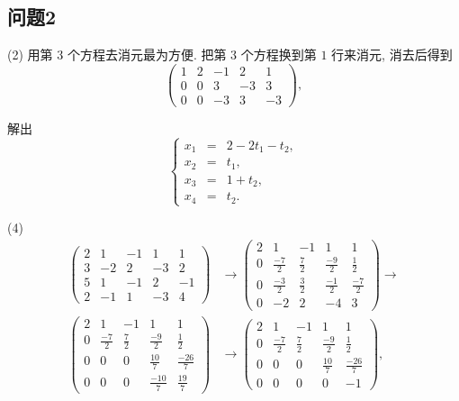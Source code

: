 \newpage
\subsection*{问题2}

(2) 用第 $3$ 个方程去消元最为方便. 把第 $3$ 个方程换到第 $1$ 行来消元, 消去后得到
\[
\left(
\begin{array}{cccc|c}
    1 & 2 & -1 & 2 & 1 \\
    0 & 0 & 3 & -3 & 3 \\
    0 & 0 & -3 & 3 & -3 
\end{array}
\right),
\]

解出
\[
    \left\{
    \begin{aligned}
    x_1 &{}={} & 2 - 2t_1 - t_2, \\
    x_2 &{}={} & t_1, \\
    x_3 &{}={} & 1 + t_2, \\
    x_4 &{}={} & t_2.
    \end{aligned}
    \right.
\]

(4) 
\[
\begin{aligned}
\left(
\begin{array}{cccc|c}
    2 & 1 & -1 & 1 & 1 \\
    3 & -2 & 2 & -3 & 2 \\
    5 & 1 & -1 & 2 & -1 \\
    2 & -1 & 1 & -3 & 4
\end{array}
\right)
& \to 
\left(
\begin{array}{cccc|c}
    2 & 1 & -1 & 1 & 1 \\
    0 & \frac{-7}{2} & \frac{7}{2} & \frac{-9}{2} & \frac{1}{2} \\
    0 & \frac{-3}{2} & \frac{3}{2} & \frac{-1}{2} & \frac{-7}{2} \\
    0 & -2 & 2 & -4 & 3
\end{array}
\right) \to \\
\left(
\begin{array}{cccc|c}
    2 & 1 & -1 & 1 & 1 \\
    0 & \frac{-7}{2} & \frac{7}{2} & \frac{-9}{2} & \frac{1}{2} \\
    0 & 0 & 0 & \frac{10}{7} & \frac{-26}{7} \\
    0 & 0 & 0 & \frac{-10}{7} & \frac{19}{7}    
\end{array}
\right) 
& \to 
\left(
\begin{array}{cccc|c}
    2 & 1 & -1 & 1 & 1 \\
    0 & \frac{-7}{2} & \frac{7}{2} & \frac{-9}{2} & \frac{1}{2} \\
    0 & 0 & 0 & \frac{10}{7} & \frac{-26}{7} \\
    0 & 0 & 0 & 0 & -1
\end{array}
\right),
\end{aligned}
\]

